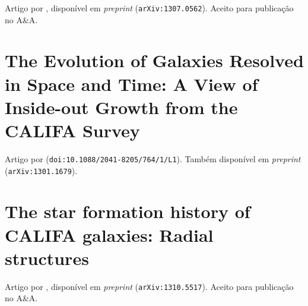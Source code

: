 Artigo por \cite{CidFernandes2013b}, disponível em {\em preprint}
(\texttt{arXiv:1307.0562}). Aceito para publicação no A\&A.

\cleardoublepage





\section{The Evolution of Galaxies Resolved in Space and Time: A View of
Inside-out Growth from the CALIFA Survey}
\label{apendice:InsideOut}

Artigo por \cite{Perez2013} (\texttt{doi:10.1088/2041-8205/764/1/L1}).
Também disponível em {\em preprint} (\texttt{arXiv:1301.1679}).

\cleardoublepage





\section{The star formation history of CALIFA galaxies: Radial structures}
\label{apendice:RadStruct}

Artigo por \cite{GonzalezDelgado2013}, disponível em {\em preprint}
(\texttt{arXiv:1310.5517}). Aceito para publicação no A\&A.

\cleardoublepage




